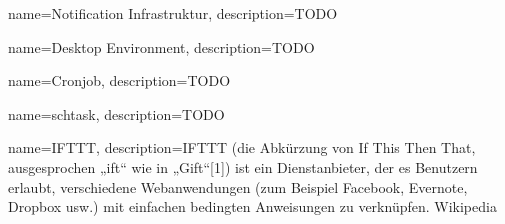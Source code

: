 {
  name=Notification Infrastruktur,
  description={TODO}
} 

{
  name=Desktop Environment,
  description={TODO}
} 

{
  name=Cronjob,
  description={TODO}
} 

{
  name=schtask,
  description={TODO}
} 

{
  name=IFTTT,
  description={IFTTT (die Abkürzung von If This Then That, ausgesprochen „ift“ wie in „Gift“[1]) ist ein Dienstanbieter, der es Benutzern erlaubt, verschiedene Webanwendungen (zum Beispiel Facebook, Evernote, Dropbox usw.) mit einfachen bedingten Anweisungen zu verknüpfen. Wikipedia}
} 





